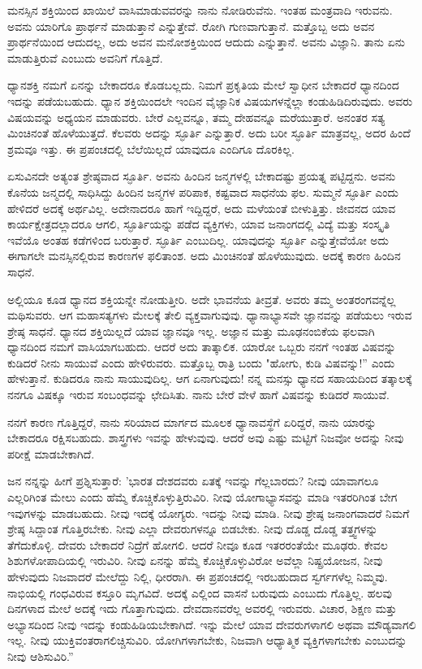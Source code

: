 ಮನಸ್ಸಿನ ಶಕ್ತಿಯಿಂದ ಖಾಯಿಲೆ ವಾಸಿಮಾಡುವವರನ್ನು ನಾನು ನೋಡಿರುವೆನು. ಇಂತಹ ಮಂತ್ರವಾದಿ ಇರುವನು. ಅವನು ಯಾರಿಗೊ ಪ್ರಾರ್ಥನೆ ಮಾಡುತ್ತಾನೆ ಎನ್ನುತ್ತೇವೆ. ರೋಗಿ ಗುಣವಾಗುತ್ತಾನೆ. ಮತ್ತೊಬ್ಬ ಅದು ಅವನ ಪ್ರಾರ್ಥನೆಯಿಂದ ಆದುದಲ್ಲ, ಅದು ಅವನ ಮನೋಶಕ್ತಿಯಿಂದ ಆದುದು ಎನ್ನುತ್ತಾನೆ. ಅವನು ವಿಜ್ಞಾನಿ. ತಾನು ಏನು ಮಾಡುತ್ತಿರುವೆ ಎಂಬುದು ಅವನಿಗೆ ಗೊತ್ತಿದೆ.

ಧ್ಯಾನಶಕ್ತಿ ನಮಗೆ ಏನನ್ನು ಬೇಕಾದರೂ ಕೊಡಬಲ್ಲದು. ನಿಮಗೆ ಪ್ರಕೃತಿಯ ಮೇಲೆ ಸ್ವಾಧೀನ ಬೇಕಾದರೆ ಧ್ಯಾನದಿಂದ ಇದನ್ನು ಪಡೆಯಬಹುದು. ಧ್ಯಾನ ಶಕ್ತಿಯಿಂದಲೇ ಇಂದಿನ ವೈಜ್ಞಾನಿಕ ವಿಷಯಗಳನ್ನೆಲ್ಲಾ ಕಂಡುಹಿಡಿದಿರುವುದು. ಅವರು ವಿಷಯವನ್ನು ಅಧ್ಯಯನ ಮಾಡುವರು. ಬೇರೆ ಎಲ್ಲವನ್ನೂ, ತಮ್ಮ ದೇಹವನ್ನೂ ಮರೆಯುತ್ತಾರೆ. ಅನಂತರ ಸತ್ಯ ಮಿಂಚಿನಂತೆ ಹೊಳೆಯುತ್ತದೆ. ಕೆಲವರು ಅದನ್ನು ಸ್ಫೂರ್ತಿ ಎನ್ನುತ್ತಾರೆ. ಅದು ಬರೀ ಸ್ಫೂರ್ತಿ ಮಾತ್ರವಲ್ಲ, ಅದರ ಹಿಂದೆ ಶ್ರಮವೂ ಇತ್ತು. ಈ ಪ್ರಪಂಚದಲ್ಲಿ ಬೆಲೆಯಿಲ್ಲದೆ ಯಾವುದೂ ಎಂದಿಗೂ ದೊರಕಿಲ್ಲ.

ಏಸುವಿನದೇ ಅತ್ಯಂತ ಶ್ರೇಷ್ಠವಾದ ಸ್ಫೂರ್ತಿ. ಅವನು ಹಿಂದಿನ ಜನ್ಮಗಳಲ್ಲಿ ಬೇಕಾದಷ್ಟು ಪ್ರಯತ್ನ ಪಟ್ಟಿದ್ದನು. ಅವನು ಕೊನೆಯ ಜನ್ಮದಲ್ಲಿ ಸಾಧಿಸಿದ್ದು ಹಿಂದಿನ ಜನ್ಮಗಳ ಪರಿಪಾಕ, ಕಷ್ಟವಾದ ಸಾಧನೆಯ ಫಲ. ಸುಮ್ಮನೆ ಸ್ಫೂರ್ತಿ ಎಂದು ಹೇಳಿದರೆ ಅದಕ್ಕೆ ಅರ್ಥವಿಲ್ಲ. ಅದೇನಾದರೂ ಹಾಗೆ ಇದ್ದಿದ್ದರೆ, ಅದು ಮಳೆಯಂತೆ ಬೀಳುತ್ತಿತ್ತು. ಜೀವನದ ಯಾವ ಕಾರ್ಯಕ್ಷೇತ್ರದಲ್ಲಾದರೂ ಆಗಲಿ, ಸ್ಫೂರ್ತಿಯನ್ನು ಪಡೆದ ವ್ಯಕ್ತಿಗಳು, ಯಾವ ಜನಾಂಗದಲ್ಲಿ ವಿದ್ಯೆ ಮತ್ತು ಸಂಸ್ಕೃತಿ ಇವೆಯೊ ಅಂತಹ ಕಡೆಗಳಿಂದ ಬರುತ್ತಾರೆ. ಸ್ಫೂರ್ತಿ ಎಂಬುದಿಲ್ಲ. ಯಾವುದನ್ನು ಸ್ಫೂರ್ತಿ ಎನ್ನುತ್ತೇವೆಯೋ ಅದು ಈಗಾಗಲೇ ಮನಸ್ಸಿನಲ್ಲಿರುವ ಕಾರಣಗಳ ಫಲಿತಾಂಶ. ಅದು ಮಿಂಚಿನಂತೆ ಹೊಳೆಯುವುದು. ಅದಕ್ಕೆ ಕಾರಣ ಹಿಂದಿನ ಸಾಧನೆ.

ಅಲ್ಲಿಯೂ ಕೂಡ ಧ್ಯಾನದ ಶಕ್ತಿಯನ್ನೇ ನೋಡುತ್ತೀರಿ. ಅದೇ ಭಾವನೆಯ ತೀವ್ರತೆ. ಅವರು ತಮ್ಮ ಅಂತರಂಗವನ್ನೆಲ್ಲ ಮಥಿಸುವರು. ಆಗ ಮಹಾಸತ್ಯಗಳು ಮೇಲಕ್ಕೆ ತೇಲಿ ವ್ಯಕ್ತವಾಗುವುವು. ಧ್ಯಾನಾಭ್ಯಾಸವೇ ಜ್ಞಾನವನ್ನು ಪಡೆಯಲು ಇರುವ ಶ್ರೇಷ್ಠ ಸಾಧನೆ. ಧ್ಯಾನದ ಶಕ್ತಿಯಿಲ್ಲದೆ ಯಾವ ಜ್ಞಾನವೂ ಇಲ್ಲ. ಅಜ್ಞಾನ ಮತ್ತು ಮೂಢನಂಬಿಕೆಯ ಫಲವಾಗಿ ಧ್ಯಾನದಿಂದ ನಮಗೆ ವಾಸಿಯಾಗಬಹುದು. ಆದರೆ ಅದು ತಾತ್ಕಾಲಿಕ. ಯಾರೋ ಒಬ್ಬರು ನನಗೆ ಇಂತಹ ವಿಷವನ್ನು ಕುಡಿದರೆ ನೀನು ಸಾಯುವೆ ಎಂದು ಹೇಳಿರುವರು. ಮತ್ತೊಬ್ಬ ರಾತ್ರಿ ಬಂದು "ಹೋಗು, ಕುಡಿ ವಿಷವನ್ನು!'' ಎಂದು ಹೇಳುತ್ತಾನೆ. ಕುಡಿದರೂ ನಾನು ಸಾಯುವುದಿಲ್ಲ. ಆಗ ಏನಾಗುವುದು! ನನ್ನ ಮನಸ್ಸು ಧ್ಯಾನದ ಸಹಾಯದಿಂದ ತತ್ಕಾಲಕ್ಕೆ ನನಗೂ ವಿಷಕ್ಕೂ ಇರುವ ಸಂಬಂಧವನ್ನು ಛೇದಿಸಿತು. ನಾನು ಬೇರೆ ವೇಳೆ ಹಾಗೆ ವಿಷವನ್ನು ಕುಡಿದರೆ ಸಾಯುವೆ.

ನನಗೆ ಕಾರಣ ಗೊತ್ತಿದ್ದರೆ, ನಾನು ಸರಿಯಾದ ಮಾರ್ಗದ ಮೂಲಕ ಧ್ಯಾನಾವಸ್ಥೆಗೆ ಏರಿದ್ದರೆ, ನಾನು ಯಾರನ್ನು ಬೇಕಾದರೂ ರಕ್ಷಿಸಬಹುದು. ಶಾಸ್ತ್ರಗಳು ಇವನ್ನು ಹೇಳುವುವು. ಆದರೆ ಅವು ಎಷ್ಟು ಮಟ್ಟಿಗೆ ನಿಜವೋ ಅದನ್ನು ನೀವು ಪರೀಕ್ಷೆ ಮಾಡಬೇಕಾಗಿದೆ.

ಜನ ನನ್ನನ್ನು ಹೀಗೆ ಪ್ರಶ್ನಿಸುತ್ತಾರೆ: 'ಭಾರತ ದೇಶದವರು ಏತಕ್ಕೆ ಇವನ್ನು ಗೆಲ್ಲಬಾರದು? ನೀವು ಯಾವಾಗಲೂ ಎಲ್ಲರಿಗಿಂತ ಮೇಲು ಎಂದು ಹೆಮ್ಮೆ ಕೊಚ್ಚಿಕೊಳ್ಳುತ್ತಿರುವಿರಿ. ನೀವು ಯೋಗಾಭ್ಯಾಸವನ್ನು ಮಾಡಿ ಇತರರಿಗಿಂತ ಬೇಗ ಇವುಗಳನ್ನು ಮಾಡಬಹುದು. ನೀವು ಇದಕ್ಕೆ ಯೋಗ್ಯರು. ಇದನ್ನು ನೀವು ಮಾಡಿ. ನೀವು ಶ್ರೇಷ್ಠ ಜನಾಂಗವಾದರೆ ನಿಮಗೆ ಶ್ರೇಷ್ಠ ಸಿದ್ದಾಂತ ಗೊತ್ತಿರಬೇಕು. ನೀವು ಎಲ್ಲಾ ದೇವರುಗಳನ್ನೂ ಬಿಡಬೇಕು. ನೀವು ದೊಡ್ಡ ದೊಡ್ಡ ತತ್ತ್ವಗಳನ್ನು ತೆಗೆದುಕೊಳ್ಳಿ. ದೇವರು ಬೇಕಾದರೆ ನಿದ್ರೆಗೆ ಹೋಗಲಿ. ಆದರೆ ನೀವೂ ಕೂಡ ಇತರರಂತೆಯೇ ಮೂಢರು. ಕೇವಲ ಶಿಶುಗಳೋಪಾದಿಯಲ್ಲಿ ಇರುವಿರಿ. ನೀವು ಏನನ್ನು ಹೆಮ್ಮೆ ಕೊಚ್ಚಿಕೊಳ್ಳುವಿರೋ ಅವೆಲ್ಲಾ ನಿಷ್ಪ್ರಯೋಜನ, ನೀವು ಹೇಳುವುದು ನಿಜವಾದರೆ ಮೇಲೆದ್ದು ನಿಲ್ಲಿ, ಧೀರರಾಗಿ. ಈ ಪ್ರಪಂಚದಲ್ಲಿ ಇರಬಹುದಾದ ಸ್ವರ್ಗಗಳೆಲ್ಲ ನಿಮ್ಮವು. ನಾಭಿಯಲ್ಲಿ ಗಂಧವಿರುವ ಕಸ್ತೂರಿ ಮೃಗವಿದೆ. ಅದಕ್ಕೆ ಎಲ್ಲಿಂದ ವಾಸನೆ ಬರುವುದು ಎಂಬುದು ಗೊತ್ತಿಲ್ಲ. ಹಲವು ದಿನಗಳಾದ ಮೇಲೆ ಅದಕ್ಕೆ ಇದು ಗೊತ್ತಾಗುವುದು. ದೇವದಾನವರೆಲ್ಲ ಅವರಲ್ಲಿ ಇರುವರು. ವಿಚಾರ, ಶಿಕ್ಷಣ ಮತ್ತು ಅಭ್ಯಾಸದಿಂದ ನೀವು ಇದನ್ನು ಕಂಡುಹಿಡಿಯಬೇಕಾಗಿದೆ. ಇನ್ನು ಮೇಲೆ ಯಾವ ದೇವರುಗಳಾಗಲಿ ಅಥವಾ ಮೌಡ್ಯವಾಗಲಿ ಇಲ್ಲ. ನೀವು ಯುಕ್ತಿವಂತರಾಗಲಿಚ್ಚಿಸುವಿರಿ. ಯೋಗಿಗಳಾಗಬೇಕು, ನಿಜವಾಗಿ ಆಧ್ಯಾತ್ಮಿಕ ವ್ಯಕ್ತಿಗಳಾಗಬೇಕು ಎಂಬುದನ್ನು ನೀವು ಆಶಿಸುವಿರಿ.”

